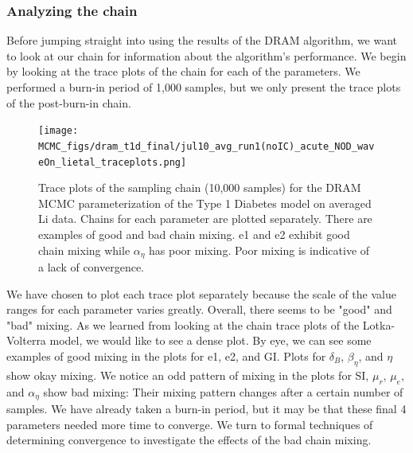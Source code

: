 \documentclass{article}
\begin{document}
\subsubsection{Analyzing the chain}
Before jumping straight into using the results of the DRAM algorithm, we want to look at our chain for information about the algorithm's performance. We begin by looking at the trace plots of the chain for each of the parameters. We performed a burn-in period of 1,000 samples, but we only present the trace plots of the post-burn-in chain.
\begin{figure}[H]
    \centering
    \texttt{[image: MCMC\_figs/dram\_t1d\_final/jul10\_avg\_run1(noIC)\_acute\_NOD\_waveOn\_lietal\_traceplots.png]}
    \caption{Trace plots of the sampling chain (10,000 samples) for the DRAM MCMC parameterization of the Type 1 Diabetes model on averaged Li data. Chains for each parameter are plotted separately. There are examples of good and bad chain mixing. e1 and e2 exhibit good chain mixing while $\alpha_\eta$ has poor mixing. Poor mixing is indicative of a lack of convergence.}
    \label{fig:14mcmc}
\end{figure}
We have chosen to plot each trace plot separately because the scale of the value ranges for each parameter varies greatly. Overall, there seems to be "good" and "bad" mixing. As we learned from looking at the chain trace plots of the Lotka-Volterra model, we would like to see a dense plot. By eye, we can see some examples of good mixing in the plots for e1, e2, and GI. Plots for $\delta_B$, $\beta_{\eta}$, and $\eta$ show okay mixing. We notice an odd pattern of mixing in the plots for SI, $\mu_r$, $\mu_e$, and $\alpha_{\eta}$ show bad mixing: Their mixing pattern changes after a certain number of samples. We have already taken a burn-in period, but it may be that these final 4 parameters needed more time to converge. We turn to formal techniques of determining convergence to investigate the effects of the bad chain mixing.
\end{document}
